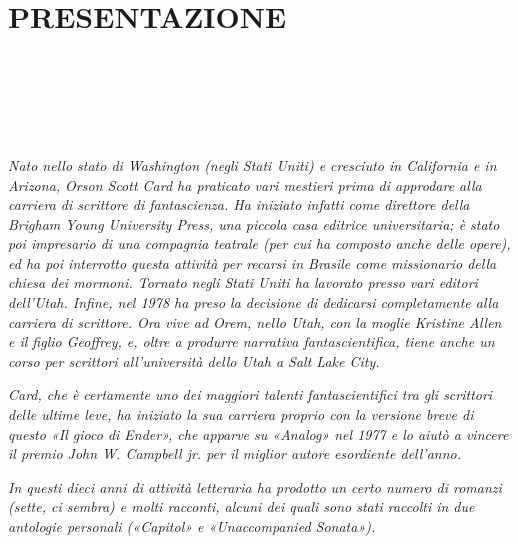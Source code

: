 { \chapter*{PRESENTAZIONE}
	
\setcounter{page}{1}

\emph{{~}}

\emph{{~}}

\emph{{~}}

\emph{{Nato nello stato di Washington (negli Stati Uniti) e cresciuto in
		California e in Arizona, Orson Scott Card ha praticato vari mestieri
		prima di approdare alla carriera di scrittore di fantascienza. Ha
		iniziato infatti come direttore della Brigham Young University Press,
		una piccola casa editrice universitaria; è stato poi impresario di una
		compagnia teatrale (per cui ha composto anche delle opere), ed ha poi
		interrotto questa attività per recarsi in Brasile come missionario della
		chiesa dei mormoni. Tornato negli Stati Uniti ha lavorato presso vari
		editori dell'Utah. Infine, nel 1978 ha preso la decisione di dedicarsi
		completamente alla carriera di scrittore. Ora vive ad Orem, nello Utah,
		con la moglie Kristine Allen e il figlio Geoffrey, e, oltre a produrre
		narrativa fantascientifica, tiene anche un corso per scrittori
		all'università dello Utah a Salt Lake City.}}

\emph{{Card, che è certamente uno dei maggiori talenti fantascientifici
		tra gli scrittori delle ultime leve, ha iniziato la sua carriera proprio
		con la versione breve di questo «Il gioco di Ender», che apparve su
		«Analog» nel 1977 e lo aiutò a vincere il premio John W. Campbell jr.
		per il miglior autore esordiente dell'anno.}}

\emph{{In questi dieci anni di attività letteraria ha prodotto un certo
		numero di romanzi (sette, ci sembra) e molti racconti, alcuni dei quali
		sono stati raccolti in due antologie personali («Capitol» e
		«Unaccompanied Sonata»).}}

}
